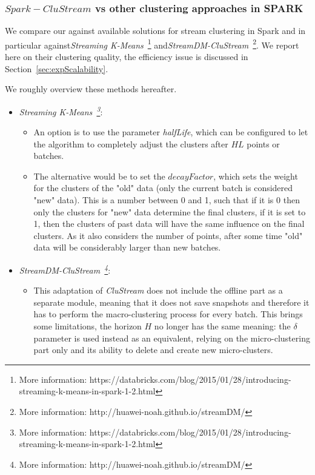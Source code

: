 \subsubsection{$Spark-CluStream$ vs other clustering approaches in SPARK}
\label{sec:expQuality-vs-SPARK}
We compare our \our against available solutions for stream clustering in Spark and in particular against\textit{Streaming K-Means}~\footnote{More information: https://databricks.com/blog/2015/01/28/introducing-streaming-k-means-in-spark-1-2.html} and\textit{StreamDM-CluStream}~\footnote{More information: http://huawei-noah.github.io/streamDM/}.
We report here on their clustering quality, the efficiency issue is discussed in Section~\ref{sec:expScalability}.

We roughly overview these methods hereafter.

\begin{itemize}  \item \textit{Streaming K-Means~\footnote{More information: https://databricks.com/blog/2015/01/28/introducing-streaming-k-means-in-spark-1-2.html}}:
 \begin{itemize}
  \item An option is to use the parameter \textit{halfLife}, which can be configured to let the algorithm to completely adjust the clusters after $HL$ points or batches.
  \item The alternative would be to set the $decayFactor$, which sets the weight for the clusters of the "old" data (only the current batch is considered "new" data). This is a number between 0 and 1, such that if it is 0 then only the clusters for "new" data determine the final clusters, if it is set to 1, then the clusters of past data will have the same influence on the final clusters. As it also considers the number of points, after some time "old" data will be considerably larger than new batches.
 \end{itemize}
 \item \textit{StreamDM-CluStream~\footnote{More information: http://huawei-noah.github.io/streamDM/}}:
 \begin{itemize}
  \item This adaptation of \textit{CluStream} does not include the offline part as a separate module, meaning that it does not save snapshots and therefore it has to perform the macro-clustering process for every batch. This brings some limitations, the horizon $H$ no longer has the same meaning: the $\delta$ parameter is used instead as an equivalent, relying on the micro-clustering part only and its ability to delete and create new micro-clusters.
\end{itemize}
\end{itemize}


